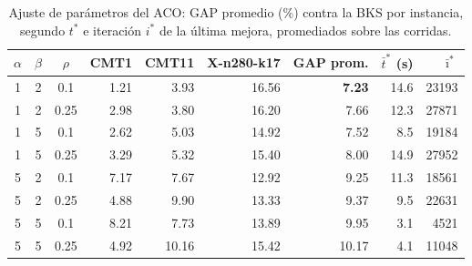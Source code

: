 \begin{table}[htbp]
\centering
\small
\begin{tabular}{cccrrrrrr}
\toprule
$\alpha$ & $\beta$ & $\rho$ & CMT1 & CMT11 & X-n280-k17 & GAP prom. & $\bar t^*$ (s) & $\bar\imath^*$ \\
\midrule
1 & 2 & 0.1 & 1.21 & 3.93 & 16.56 & \textbf{7.23} & 14.6 & 23193 \\
1 & 2 & 0.25 & 2.98 & 3.80 & 16.20 & 7.66 & 12.3 & 27871 \\
1 & 5 & 0.1 & 2.62 & 5.03 & 14.92 & 7.52 & 8.5 & 19184 \\
1 & 5 & 0.25 & 3.29 & 5.32 & 15.40 & 8.00 & 14.9 & 27952 \\
5 & 2 & 0.1 & 7.17 & 7.67 & 12.92 & 9.25 & 11.3 & 18561 \\
5 & 2 & 0.25 & 4.88 & 9.90 & 13.33 & 9.37 & 9.5 & 22631 \\
5 & 5 & 0.1 & 8.21 & 7.73 & 13.89 & 9.95 & 3.1 & 4521 \\
5 & 5 & 0.25 & 4.92 & 10.16 & 15.42 & 10.17 & 4.1 & 11048 \\
\bottomrule
\end{tabular}
\caption{Ajuste de parámetros del ACO: GAP promedio (\%) contra la BKS por instancia, segundo $t^*$ e iteración $i^*$ de la última mejora, promediados sobre las corridas.}
\label{tab:ajuste_aco}
\end{table}
